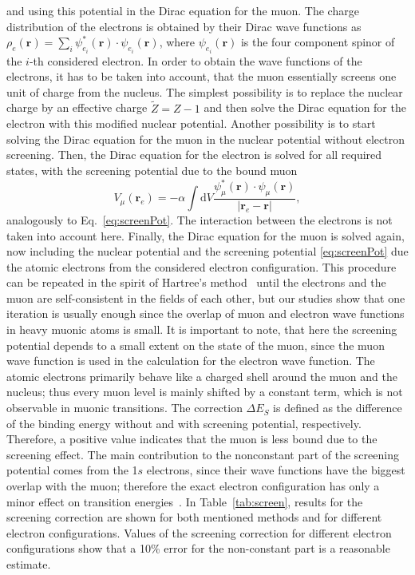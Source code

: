 and using this potential in the Dirac equation for the muon. The charge distribution of the electrons is obtained by their Dirac wave functions as $\rho_e (\mathbf{r})=\sum_i \psi_{e_i}^*(\mathbf{r})\cdot \psi_{e_i}(\mathbf{r})$, where $\psi_{e_i}(\mathbf{r})$  is the four component spinor of the $i$-th considered electron. In order to obtain the wave functions of the electrons, it has to be taken into account, that the muon essentially screens one unit of charge from the nucleus. The simplest possibility is to replace the nuclear charge by an effective charge $\tilde{Z}=Z-1$ and then solve the Dirac equation for the electron with this modified nuclear potential. Another possibility is to start solving the Dirac equation for the muon in the nuclear potential without electron screening. Then, the Dirac equation for the electron is solved for all required states, with the screening potential due to the bound muon
\begin{equation}
V_{\mu}(\mathbf{r}_e)=-\alpha \int \mathrm{d}V\frac{\psi_\mu^*(\mathbf{r})\cdot \psi_\mu(\mathbf{r})}{|\mathbf{r}_e-\mathbf{r}|},
\end{equation}
analogously to Eq.~\eqref{eq:screenPot}.
The interaction between the electrons is not taken into account here. Finally, the Dirac equation for the muon is solved again, now including the nuclear potential and the screening potential \eqref{eq:screenPot} due the atomic electrons from the considered electron configuration. This procedure can be repeated in the spirit of Hartree's method~\cite{bethe_salpeter} until the electrons and the muon are self-consistent in the fields of each other, but our studies show that one iteration is usually enough since the overlap of muon and electron wave functions in heavy muonic atoms is small. It is important to note, that here the screening potential depends to a small extent on the state of the muon, since the muon wave function is used in the calculation for the electron wave function. The atomic electrons primarily behave like a charged shell around the muon and the nucleus; thus every muon level is mainly shifted by a constant term, which is not observable in muonic transitions. The correction $\Delta E_S$ is defined as the difference of the binding energy without and with screening potential, respectively. Therefore, a positive value indicates that the muon is less bound due to the screening effect. The main contribution to the nonconstant part of the screening potential comes from the 1$s$ electrons, since their wave functions have the biggest overlap with the muon; therefore the exact electron configuration has only a minor effect on transition energies~\cite{vogel1973}. In Table~\ref{tab:screen}, results for the screening correction are shown for both mentioned methods and for different electron configurations. Values of the screening correction for different electron configurations show that a 10\% error for the non-constant part is a reasonable estimate.
%
%
